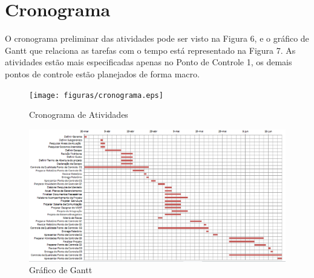 \section{Cronograma}
O cronograma preliminar das atividades pode ser visto na Figura 6, e o gráfico de Gantt que relaciona as tarefas com o tempo está representado na Figura 7. As atividades estão mais especificadas apenas no Ponto de Controle 1, os demais pontos de controle estão planejados de forma macro.

 \begin{figure}[ht]
	\centering
		\texttt{[image: figuras/cronograma.eps]}
	\caption{Cronograma de Atividades}
\end{figure}

 \begin{figure}[ht]
	\centering
		\includegraphics[keepaspectratio=true,scale=0.5]{figuras/gantt.eps}
	\caption{Gráfico de Gantt}
\end{figure}


